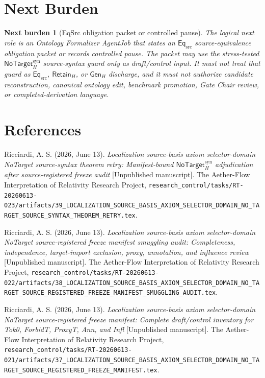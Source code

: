 \documentclass[11pt]{article}
\newcommand{\GenH}{\mathsf{Gen}_{H}}
\newcommand{\EqSrc}{\mathsf{Eq}_{\mathrm{src}}}
\newcommand{\RetainH}{\mathsf{Retain}_{H}}
\newcommand{\NoTargetSyn}{\mathsf{NoTarget}_{H}^{\mathrm{syn}}}
\newtheorem{nextburden}{Next burden}
\begin{document}
\section{Next Burden}

\begin{nextburden}[EqSrc obligation packet or controlled pause]
The logical next role is an Ontology Formalizer AgentJob that states an
\(\EqSrc\) source-equivalence obligation packet or records controlled
pause. The packet may use the stress-tested \(\NoTargetSyn\) source-syntax
guard only as draft/control input. It must not treat that guard as
\(\EqSrc\), \(\RetainH\), or \(\GenH\) discharge, and it must not
authorize candidate reconstruction, canonical ontology edit, benchmark
promotion, Gate Chair review, or completed-derivation language.
\end{nextburden}

\section*{References}

Ricciardi, A. S. (2026, June 13). \emph{Localization source-basis axiom
selector-domain NoTarget source-syntax theorem retry: Manifest-bound
\(\NoTargetSyn\) adjudication after source-registered freeze audit}
[Unpublished manuscript]. The Aether-Flow Interpretation of Relativity
Research Project,
\texttt{research\_control/tasks/RT-20260613-023/artifacts/39\_LOCALIZATION\_SOURCE\_BASIS\_AXIOM\_SELECTOR\_DOMAIN\_NO\_TARGET\_SOURCE\_SYNTAX\_THEOREM\_RETRY.tex}.

Ricciardi, A. S. (2026, June 13). \emph{Localization source-basis axiom
selector-domain NoTarget source-registered freeze manifest smuggling audit:
Completeness, independence, target-import exclusion, proxy, annotation, and
influence review} [Unpublished manuscript]. The Aether-Flow Interpretation
of Relativity Research Project,
\texttt{research\_control/tasks/RT-20260613-022/artifacts/38\_LOCALIZATION\_SOURCE\_BASIS\_AXIOM\_SELECTOR\_DOMAIN\_NO\_TARGET\_SOURCE\_REGISTERED\_FREEZE\_MANIFEST\_SMUGGLING\_AUDIT.tex}.

Ricciardi, A. S. (2026, June 13). \emph{Localization source-basis axiom
selector-domain NoTarget source-registered freeze manifest: Complete
draft/control inventory for Tok0, ForbidT, ProxyT, Ann, and Infl}
[Unpublished manuscript]. The Aether-Flow Interpretation of Relativity
Research Project,
\texttt{research\_control/tasks/RT-20260613-021/artifacts/37\_LOCALIZATION\_SOURCE\_BASIS\_AXIOM\_SELECTOR\_DOMAIN\_NO\_TARGET\_SOURCE\_REGISTERED\_FREEZE\_MANIFEST.tex}.
\end{document}
